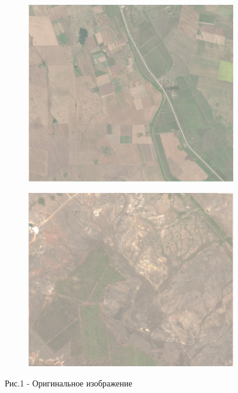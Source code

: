 \begin{figure}[H]
   \centering
   \begin{subfigure}{0.45\textwidth}
   	\centering
   	\includegraphics[width=\textwidth,height=0.8\textwidth]{media/ict/image31}
   \end{subfigure}
   \begin{subfigure}{0.45\textwidth}
   	\centering
   	\includegraphics[width=\textwidth,height=0.8\textwidth]{media/ict/image32}
   \end{subfigure}
   \caption*{Рис.1 - Оригинальное изображение}
\end{figure}

